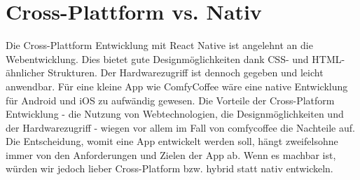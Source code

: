 \section{Cross-Plattform vs. Nativ}
Die Cross-Plattform Entwicklung mit React Native ist angelehnt an die Webentwicklung. Dies bietet gute Designmöglichkeiten dank CSS- und HTML-ähnlicher Strukturen. Der Hardwarezugriff ist dennoch gegeben und leicht anwendbar. Für eine kleine App wie ComfyCoffee wäre eine native Entwicklung für Android und iOS zu aufwändig gewesen. Die Vorteile der Cross-Platform Entwicklung - die Nutzung von Webtechnologien, die Designmöglichkeiten und der Hardwarezugriff - wiegen vor allem im Fall von comfycoffee die Nachteile auf. Die Entscheidung, womit eine App entwickelt werden soll, hängt zweifelsohne immer von den Anforderungen und Zielen der App ab. Wenn es machbar ist, würden wir jedoch lieber Cross-Platform bzw. hybrid statt nativ entwickeln.